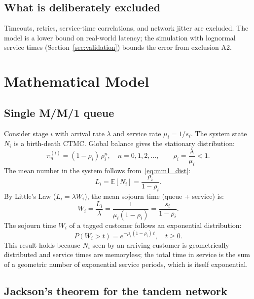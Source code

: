 \documentclass[12pt,a4paper]{article}
\newcommand{\E}[1]{\mathbb{E}\!\left[#1\right]}
\begin{document}
\subsection{What is deliberately excluded}

Timeouts, retries, service-time correlations, and network jitter are excluded. The model
is a lower bound on real-world latency; the simulation with lognormal service times
(Section~\ref{sec:validation}) bounds the error from exclusion A2.

\section{Mathematical Model}
\label{sec:math}

\subsection{Single M/M/1 queue}

Consider stage $i$ with arrival rate $\lambda$ and service rate $\mu_i = 1/s_i$.
The system state $N_i$ is a birth-death CTMC. Global balance gives the stationary
distribution:
\begin{equation}
  \pi_n^{(i)} = (1 - \rho_i)\,\rho_i^n, \quad n = 0,1,2,\ldots,
  \qquad \rho_i = \frac{\lambda}{\mu_i} < 1.
  \label{eq:mm1_dist}
\end{equation}
The mean number in the system follows from~\eqref{eq:mm1_dist}:
\begin{equation}
  L_i = \E{N_i} = \frac{\rho_i}{1 - \rho_i}.
  \label{eq:mm1_L}
\end{equation}
By Little's Law ($L_i = \lambda W_i$), the mean sojourn time (queue + service) is:
\begin{equation}
  W_i = \frac{L_i}{\lambda} = \frac{1}{\mu_i(1-\rho_i)} = \frac{s_i}{1-\rho_i}.
  \label{eq:mm1_W}
\end{equation}
The sojourn time $W_i$ of a tagged customer follows an exponential distribution:
\begin{equation}
  P(W_i > t) = e^{-\mu_i(1-\rho_i)\,t}, \quad t \geq 0.
  \label{eq:mm1_cdf}
\end{equation}
This result holds because $N_i$ seen by an arriving customer is geometrically distributed
and service times are memoryless; the total time in service is the sum of a geometric
number of exponential service periods, which is itself exponential.

\subsection{Jackson's theorem for the tandem network}
\end{document}
